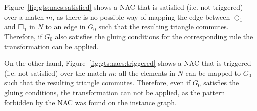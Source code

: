 \begin{example} Figure~\ref{fig:gts:nacs:satisfied} shows a NAC that is satisfied (i.e. not triggered) over a match $m$, as there is no possible way of mapping the edge between $\Circle_1$ and $\Square_1$ in $N$ to an edge in $G_0$ such that the resulting triangle commutes. Therefore, if $G_0$ also satisfies the gluing conditions for the corresponding rule the transformation can be applied.

  On the other hand, Figure~\ref{fig:gts:nacs:triggered} shows a NAC that is triggered (i.e. not satisfied) over the match $m$: all the elements in $N$ can be mapped to $G_0$ such that the resulting triangle commutes. Therefore, even if $G_0$ satisfies the gluing conditions, the transformation can not be applied, as the pattern forbidden by the NAC was found on the instance graph.


\end{example}
